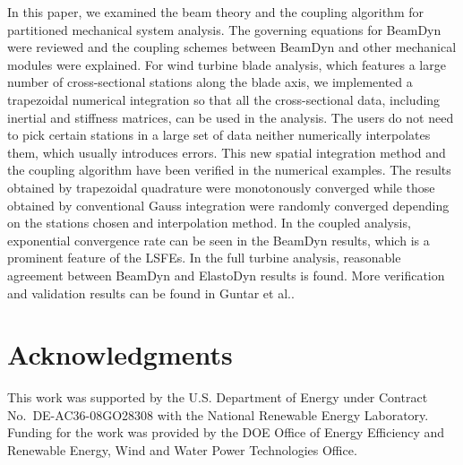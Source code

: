 \documentclass{aiaa-tc}
\begin{document}
In this paper, we examined the beam theory and the coupling algorithm for partitioned mechanical system analysis. The governing equations for BeamDyn were reviewed and the coupling schemes between BeamDyn and other mechanical modules were explained. For wind turbine blade analysis, which features a large number of cross-sectional stations along the blade axis, we implemented a trapezoidal numerical integration so that all the cross-sectional data, including inertial and stiffness matrices, can be used in the analysis. The users do not need to pick certain stations in a large set of data neither numerically interpolates them, which usually introduces errors. This new spatial integration method and the coupling algorithm have been verified in the numerical examples. The results obtained by trapezoidal quadrature were monotonously converged while those obtained by conventional Gauss integration were randomly converged depending on the stations chosen and interpolation method. In the coupled analysis, exponential convergence rate can be seen in the BeamDyn results, which is a prominent feature of the LSFEs. In the full turbine analysis, reasonable agreement between BeamDyn and ElastoDyn results is found. More verification and validation results can be found in Guntar et al.\cite{Sri:SciTech2016}.
  
\section*{Acknowledgments} 

This work was supported by the U.S. Department of Energy under Contract No.\
DE-AC36-08GO28308 with the National Renewable Energy Laboratory. Funding for the work was provided by the DOE Office of Energy Efficiency and Renewable Energy, Wind and Water Power Technologies Office.   



\end{document}
